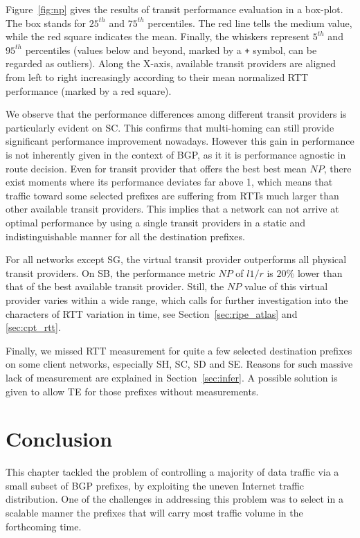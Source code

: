 Figure~\ref{fig:np} gives the results of transit performance evaluation in a box-plot.
The box stands for $25^{th}$ and $75^{th}$ percentiles. 
The red line tells the medium value, while the red square indicates the mean.
Finally, the whiskers represent $5^{th}$ and $95^{th}$ percentiles (values below and beyond, marked by a \texttt{+} symbol, can be regarded as outliers).
Along the X-axis, available transit providers are aligned from left to right increasingly according to their mean normalized RTT performance (marked by a red square). 

We observe that the performance differences among different transit providers is particularly evident on SC.
This confirms that multi-homing can still provide significant performance improvement nowadays. 
However this gain in performance is not inherently given in the context of BGP, as it it is performance agnostic in route decision.
Even for transit provider that offers the best best mean $NP$, there exist moments where its performance deviates far above 1, which means that traffic toward some selected prefixes are suffering from RTTs much larger than other available transit providers.
This implies that a network can not arrive at optimal performance by using a single transit providers in a static and indistinguishable manner for all the destination prefixes.

For all networks except SG, the virtual transit provider outperforms all physical transit providers.
On SB, the performance metric $NP$ of $l1/r$ is $20\%$ lower than that of the best available transit provider.
Still, the $NP$ value of this virtual provider varies within a wide range, which calls for further investigation into the characters of RTT variation in time, see Section~\ref{sec:ripe_atlas} and \ref{sec:cpt_rtt}.

Finally, we missed RTT measurement for quite a few selected destination prefixes on some client networks, especially SH, SC, SD and SE. Reasons for such massive lack of measurement are explained in Section~\ref{sec:infer}.
A possible solution is given to allow TE for those prefixes without measurements.

\section*{Conclusion}
\label{sec:fut}
This chapter tackled the problem of controlling a majority of data traffic via 
a small subset of BGP prefixes, by exploiting the uneven Internet traffic distribution. 
One of the challenges in addressing this problem was to select in a scalable manner the prefixes that will carry most traffic volume in the forthcoming time.  

